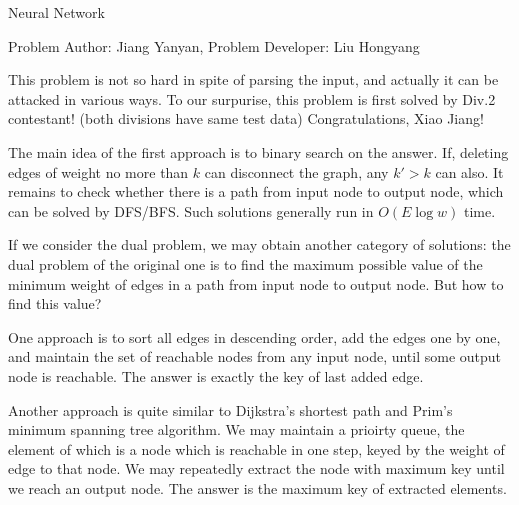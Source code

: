 \begin{Solution}{Neural Network}

\begin{frame}{\ProblemName}

\small Problem Author: Jiang Yanyan, Problem Developer: Liu Hongyang \par \vspace{0.3cm}


This problem is not so hard in spite of parsing the input, and actually it can be attacked in various ways. To our surpurise, this problem is first solved by Div.2 contestant! (both divisions have same test data) Congratulations, Xiao Jiang!

\pause

The main idea of the first approach is to binary search on the answer. If, deleting edges of weight no more than $k$ can disconnect the graph, any $k' > k$ can also. It remains to check whether there is a path from input node to output node, which can be solved by DFS/BFS. Such solutions generally run in $O(E \log w)$ time.

\end{frame}

\begin{frame}{\ProblemName}

If we consider the dual problem, we may obtain another category of solutions:
the dual problem of the original one is to find the maximum possible value of the minimum weight of edges in a path from input node to output node. But how to find this value?

\pause

One approach is to sort all edges in descending order, add the edges one by one, and maintain the set of reachable nodes from any input node, until some output node is reachable. The answer is exactly the key of last added edge.

\pause

Another approach is quite similar to Dijkstra's shortest path and Prim's minimum spanning tree algorithm. We may maintain a prioirty queue, the element of which is a node which is reachable in one step, keyed by the weight of edge to that node. We may repeatedly extract the node with maximum key until we reach an output node. The answer is the maximum key of extracted elements.

\end{frame}

\end{Solution}
